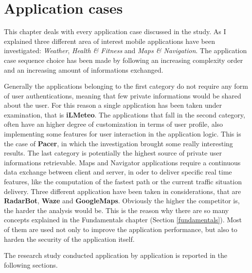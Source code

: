\chapter{Application cases}
\label{chap:use_cases}
	\par This chapter deals with every application case discussed in the study. As I explained three different area of interest mobile applications have been investigated: \textit{Weather}, \textit{Health \& Fitness} and \textit{Maps \& Navigation}. The application case sequence choice  has been made by following an increasing complexity order and an increasing amount of informations exchanged. \newline
	\par Generally the applications belonging to the first category do not require any form of user authentications, meaning that few private informations would be shared about the user. For this reason a single application has been taken under examination, that is \textbf{iLMeteo}.\newline
	The applications that fall in the second category, often have an higher degree of customization in terms of user profile, also implementing some features for user interaction in the application logic. This is the case of \textbf{Pacer}, in which the investigation brought some really interesting results.\newline
	The last category is potentially the highest source of private user informations retrievable. Maps and Navigator applications require a continuous data exchange between client and server, in oder to deliver specific real time features, like the computation of the fastest path or the current traffic situation delivery. Three different application have been taken in considerations, that are \textbf{RadarBot}, \textbf{Waze} and \textbf{GoogleMaps}. \newline
	Obviously the higher the competitor is, the harder the analysis would be. This is the reason why there are so many concepts explained in the Fundamentals chapter (Section \ref{fundamentals}). Most of them are used not only to improve the application performance, but also to harden the security of the application itself. \newline
	\par The research study conducted application by application is reported in the following sections.
	
	
	
	
	
	
	
	
	
	
	
	